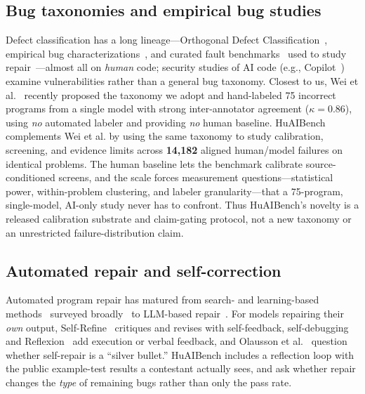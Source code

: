 \documentclass[conference]{IEEEtran}
\begin{document}
\subsection{Bug taxonomies and empirical bug studies}
Defect classification has a long lineage---Orthogonal Defect
Classification~\cite{chillarege1992odc}, empirical bug
characterizations~\cite{tan2014bugcharacteristics,karampatsis2020sstubs,catolino2019categorization},
and curated fault benchmarks~\cite{just2014defects4j,legoues2015manybugs} used to
study repair~\cite{tufano2019learning}---almost all on \emph{human} code; security
studies of AI code (e.g., Copilot~\cite{pearce2022copilot}) examine vulnerabilities
rather than a general bug taxonomy. Closest to us, Wei et al.~\cite{wei2026evaluating}
recently proposed the taxonomy we adopt and hand-labeled 75 incorrect programs from a
single model with strong inter-annotator agreement ($\kappa=0.86$), using \emph{no}
automated labeler and providing \emph{no} human baseline. HuAIBench complements Wei
et al. by using the same taxonomy to study calibration, screening, and evidence
limits across \textbf{14{,}182} aligned human/model failures on identical problems.
The human baseline lets the benchmark calibrate source-conditioned screens, and the
scale forces measurement questions---statistical power, within-problem clustering,
and labeler granularity---that a 75-program, single-model, AI-only study never has to
confront. Thus HuAIBench's novelty is a released calibration substrate and
claim-gating protocol, not a new taxonomy or an unrestricted failure-distribution
claim.

\subsection{Automated repair and self-correction}
Automated program repair has matured from search- and learning-based
methods~\cite{legoues2015manybugs,tufano2019learning} surveyed
broadly~\cite{monperrus2018living,gazzola2019survey} to LLM-based
repair~\cite{xia2023repair}. For models repairing their \emph{own} output,
Self-Refine~\cite{madaan2023selfrefine} critiques and revises with self-feedback,
self-debugging~\cite{chen2023selfdebug} and Reflexion~\cite{shinn2023reflexion} add
execution or verbal feedback, and Olausson et al.~\cite{olausson2024selfrepair}
question whether self-repair is a ``silver bullet.'' HuAIBench includes a reflection
loop with the public example-test results a contestant actually sees, and ask
whether repair changes the \emph{type} of remaining bugs rather than only the pass
rate.
\end{document}
